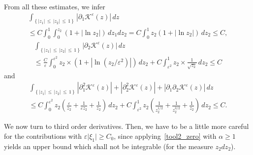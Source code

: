\documentclass[AHL,Unicode,longabstracts,published]{cedram}
\newcommand*\p{\partial}
\newcommand*\BK{\mathcal{K}}
\newcommand*\gs{\geqslant }
\newcommand*\ls{\leqslant }
\newcommand*\e{\varepsilon}
\begin{document}
From all these estimates, we infer
\begin{multline*}
\int_{\left\{ |z_1 |\,\ls\,|z_2|\,\ls\,1\right\}} \left\lvert \p_1 \BK^\e (z)\right\rvert\, dz  \\
\ls C \int_0^1 \int_0^{z_2} (1+ \lvert \ln z_2 \rvert) \, dz_1 dz_2 = C \int_0^1 z_2 (1+ \lvert \ln z_2 \rvert) \, dz_2
\ls C,
\end{multline*}
\begin{multline*}
\int_{\left\{ |z_1 |\,\ls\,|z_2|\,\ls\,1\right\}} \lvert \p_2 \BK^\e (z) \rvert\, dz \\
\ls \frac{C}{\e} \int_0^{\e^2} z_2 \times \left(1 + \left\lvert \ln \left(z_2/\e^2\right) \right\rvert \right) \, dz_2 + C \int_{\e^2}^1 z_2 \times \frac{1}{\sqrt{z_2}} \, dz_2
\ls C
\end{multline*}
and
\begin{multline*}
\int_{\left\{ |z_1 |\,\ls\,|z_2|\,\ls\,1\right\}}
\left\lvert \p_1^2 \BK^\e (z)\right\rvert + \left\lvert \p_2^2 \BK^\e (z) \right\rvert + \left\lvert \p_1 \p_2 \BK^\e (z)\right\rvert \, dz
\\  \ls C \int_0^{\e^2} z_2 \left(\frac{\e}{z_2} + \frac{1}{\e z_2 } + \frac{1}{z_2} \right) \, dz_2 + C \int_{\e^2}^1 z_2 \left(\frac{1}{z_2^{1/2}} + \frac{1}{z_2^{3/2} } + \frac{1}{ z_2} \right) \, dz_2
\ls C.
\end{multline*}

We now turn to third order derivatives. Then, we have to be a little more careful for the contributions with $ \e \lvert \xi_1 \rvert \gs C_0 $, since applying~\eqref{tool2_zero} with $ \alpha \gs 1 $ yields an upper bound which shall not be integrable (for the measure $ z_2 d z_2 $).
\end{document}
